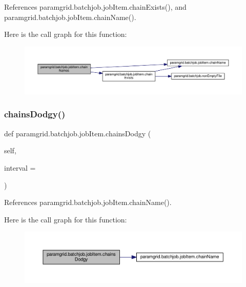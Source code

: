 References paramgrid.\+batchjob.\+job\+Item.\+chain\+Exists(), and paramgrid.\+batchjob.\+job\+Item.\+chain\+Name().

Here is the call graph for this function\+:
\nopagebreak
\begin{figure}[H]
\begin{center}
\leavevmode
\includegraphics[width=350pt]{classparamgrid_1_1batchjob_1_1jobItem_a80e05d711d7f3324d6a8a71fd2442592_cgraph}
\end{center}
\end{figure}
\mbox{\label{classparamgrid_1_1batchjob_1_1jobItem_ad8f3e85e06dcdd714b54e5280232445f}} 
\subsubsection{\texorpdfstring{chains\+Dodgy()}{chainsDodgy()}}
{\footnotesize\ttfamily def paramgrid.\+batchjob.\+job\+Item.\+chains\+Dodgy (\begin{DoxyParamCaption}\item[{}]{self,  }\item[{}]{interval = {} }\end{DoxyParamCaption})}



References paramgrid.\+batchjob.\+job\+Item.\+chain\+Name().

Here is the call graph for this function\+:
\nopagebreak
\begin{figure}[H]
\begin{center}
\leavevmode
\includegraphics[width=350pt]{classparamgrid_1_1batchjob_1_1jobItem_ad8f3e85e06dcdd714b54e5280232445f_cgraph}
\end{center}
\end{figure}
\mbox{\label{classparamgrid_1_1batchjob_1_1jobItem_afbcba65e1aeaf86c50b6e8804ce0932d}} 
